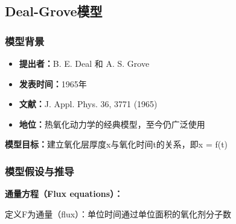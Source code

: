 \documentclass[UTF8,12pt,a4paper]{ctexart}
\begin{document}
\subsection{Deal-Grove模型}

\subsubsection{模型背景}

\begin{itemize}
    \item \textbf{提出者：}B. E. Deal 和 A. S. Grove
    \item \textbf{发表时间：}1965年
    \item \textbf{文献：}J. Appl. Phys. 36, 3771 (1965)
    \item \textbf{地位：}热氧化动力学的经典模型，至今仍广泛使用
\end{itemize}

\textbf{模型目标：}建立氧化层厚度x与氧化时间t的关系，即x = f(t)

\subsubsection{模型假设与推导}

\textbf{通量方程（Flux equations）：}

定义F为通量（flux）：单位时间通过单位面积的氧化剂分子数
\end{document}
